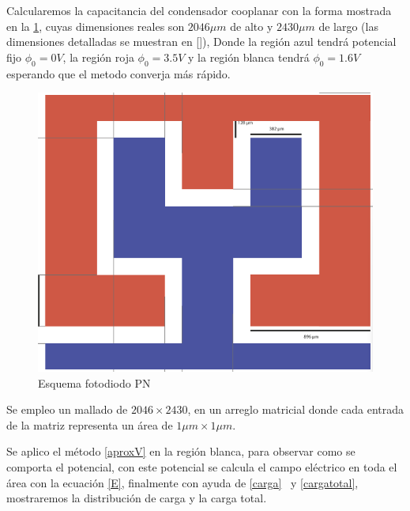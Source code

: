 Calcularemos la capacitancia del condensador cooplanar con la forma mostrada en la \ref{fig:capacitor}, cuyas dimensiones reales son  $2046 \mu m$ de alto y  $2430 \mu m$ de largo (las dimensiones detalladas se muestran en []), Donde la región azul tendrá potencial fijo $\phi_0=0V$, la región roja  $\phi_0=3.5V$ y la región blanca tendrá  $\phi_0=1.6V$ esperando que el metodo converja más rápido. 
\begin{figure}[H]
		\centering
		\includegraphics[width=0.8\columnwidth]{img/problema.png}

		\caption{Esquema fotodiodo PN }
		\label{fig:capacitor}
\end{figure}

Se empleo un mallado de $2046 \times 2430$, en un arreglo matricial donde cada entrada de la matriz representa un área de $ 1 \mu m \times  1 \mu m$. 

Se aplico el método \ref{aproxV} en la región blanca, para observar como se comporta el potencial, con este potencial se calcula el campo eléctrico en toda el área con la ecuación \ref{E}, finalmente con ayuda de \ref{carga} \ y \ref{cargatotal}, mostraremos la distribución de carga y la carga total. 

